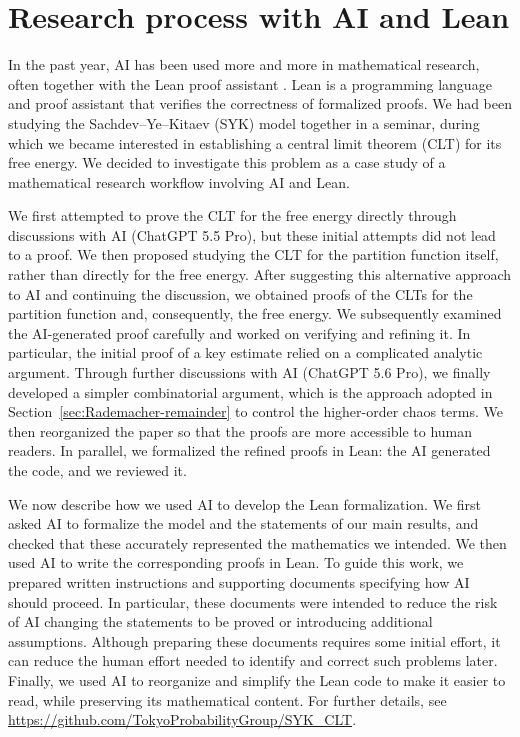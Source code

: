 \documentclass[../CLT_SYK.tex]{subfiles}
\begin{document}
\section*{Research process with AI and Lean}

In the past year, AI has been used more and more in mathematical research, often together with the Lean proof assistant \cite{GGTW2025,OpenAI}. 
Lean is a programming language and proof assistant that verifies the correctness of formalized proofs.
We had been studying the Sachdev--Ye--Kitaev (SYK) model together in a seminar, during which we became  interested in establishing  a central limit theorem (CLT) for its free energy. 
We decided to investigate this problem as a case study of a mathematical research workflow involving AI and Lean.

We first attempted to prove the CLT for the free energy directly through discussions with AI (ChatGPT 5.5 Pro), but these initial attempts did not lead to a proof.
We then proposed studying the CLT for the partition function itself, rather than directly for the free energy.
After suggesting this alternative approach to AI and continuing the discussion, we obtained proofs of the CLTs for the partition function and, consequently, the free energy. 
We subsequently examined the AI-generated proof carefully and worked on verifying and refining it.
In particular, the initial proof of a key estimate relied on a complicated analytic argument. 
Through further discussions with AI (ChatGPT 5.6 Pro), we finally developed a simpler combinatorial argument, which is the approach adopted in Section~\ref{sec:Rademacher-remainder} to control the higher-order chaos terms.
We then reorganized the paper so that the proofs are more accessible to human readers. In parallel, we formalized the refined proofs in Lean: the AI generated the code, and we reviewed it.

We now describe how we used AI to develop the Lean formalization. 
We first asked AI to formalize the model and the statements of our main results, and checked that these accurately represented the mathematics we intended. 
We then used AI to write the corresponding proofs in Lean. 
To guide this work, we prepared written instructions and supporting documents specifying how AI should proceed. 
In particular, these documents were intended to reduce the risk of AI changing the statements to be proved or introducing additional assumptions. 
Although preparing these documents requires some initial effort, it can reduce the human effort needed to identify and correct such problems later.
Finally, we used AI to reorganize and simplify the Lean code to make it easier to read, while preserving its mathematical content.
For further details, see \url{https://github.com/TokyoProbabilityGroup/SYK_CLT}.
\end{document}

